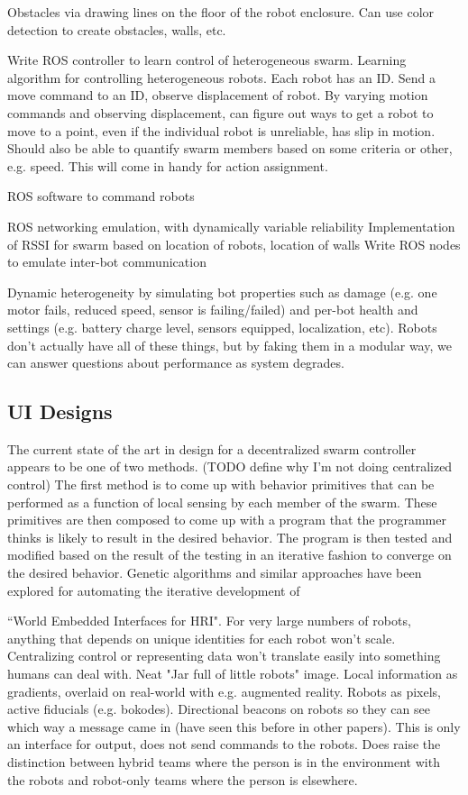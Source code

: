 \documentclass[]{article}
\begin{document}
Obstacles via drawing lines on the floor of the robot enclosure. Can use color detection to create obstacles, walls, etc. 

Write ROS controller to learn control of heterogeneous swarm.
Learning algorithm for controlling heterogeneous robots. 
Each robot has an ID. Send a move command to an ID, observe displacement of robot. 
By varying motion commands and observing displacement, can figure out ways to get a robot to move to a point, even if the individual robot is unreliable, has slip in motion. 
Should also be able to quantify swarm members based on some criteria or other, e.g. speed. This will come in handy for action assignment.

ROS software to command robots

ROS networking emulation, with dynamically variable reliability
Implementation of RSSI for swarm based on location of robots, location of walls
Write ROS nodes to emulate inter-bot communication

Dynamic heterogeneity by simulating bot properties such as damage (e.g. one motor fails, reduced speed, sensor is failing/failed) and per-bot health and settings (e.g. battery charge level, sensors equipped, localization, etc).
Robots don't actually have all of these things, but by faking them in a modular way, we can answer questions about performance as system degrades.

\subsection{UI Designs}

The current state of the art in design for a decentralized swarm controller appears to be one of two methods. (TODO define why I'm not doing centralized control)
The first method is to come up with behavior primitives that can be performed as a function of local sensing by each member of the swarm. 
These primitives are then composed to come up with a program that the programmer thinks is likely to result in the desired behavior. 
The program is then tested and modified based on the result of the testing in an iterative fashion to converge on the desired behavior. 
Genetic algorithms and similar approaches have been explored for automating the iterative development of 


``World Embedded Interfaces for HRI". \cite{Daily:2003:WEI:820752.821587} 
 For very large numbers of robots, anything that depends on unique identities for each robot won't scale. Centralizing control or representing data won't translate easily into something humans can deal with. Neat "Jar full of little robots" image. Local information as gradients, overlaid on real-world with e.g. augmented reality. Robots as pixels, active fiducials (e.g. bokodes). Directional beacons on robots so they can see which way a message came in (have seen this before in other papers). This is only an interface for output, does not send commands to the robots. Does raise the distinction between hybrid teams where the person is in the environment with the robots and robot-only teams where the person is elsewhere. 
\end{document}
